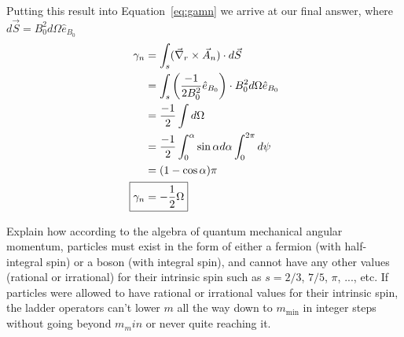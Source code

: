 \documentclass{jhwhw}
\begin{document}
Putting this result into Equation~\eqref{eq:gamn} we arrive at our final answer, where $d\vec{S} = B_0^2 d \Omega \hat{e}_{B_0}$
\begin{align}
    \gamma_n
    &=
    \int_s
    (
    \vec{\nabla}_r \times \vec{A}_n
    )
    \cdot
    d \vec{S}
    \\
    &=
    \int_s
    \left(
    \frac{-1}{2 B_0^2}
    \hat{e}_{B_0}
    \right)
    \cdot
    B_0^2 d \Omega \hat{e}_{B_0}
    \\
    &=
    \frac{-1}{2}
    \int d \Omega
    \\
    &=
    \frac{-1}{2}
    \int_0^\alpha \sin{\alpha} d \alpha \int_0^{2\pi} d \psi
    \\
    &= (1 - \cos{\alpha})\pi
    \\
    \Aboxed{
    \gamma_n
    &= 
    -\frac{1}{2} \Omega}
\end{align}

Explain how according to the algebra of quantum mechanical angular momentum, particles must exist in the form of either a fermion (with half-integral spin) or a boson (with integral spin), and cannot have any other values (rational or irrational) for their intrinsic spin such as $s = 2/3$, $7/5$, $\pi$, ..., etc.
\solution
If particles were allowed to have rational or irrational values for their intrinsic spin, the ladder operators can't lower $m$ all the way down to $m_\text{min}$ in integer steps without going beyond $m_min$ or never quite reaching it.  
\end{document}

